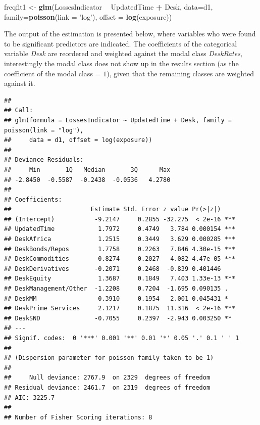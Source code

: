 \documentclass[]{DissertateUSU}
\newenvironment{Shaded}{\begin{snugshade}}{\end{snugshade}}
\newcommand{\KeywordTok}[1]{\textcolor[rgb]{0.13,0.29,0.53}{\textbf{#1}}}
\newcommand{\DataTypeTok}[1]{\textcolor[rgb]{0.13,0.29,0.53}{#1}}
\newcommand{\StringTok}[1]{\textcolor[rgb]{0.31,0.60,0.02}{#1}}
\newcommand{\OperatorTok}[1]{\textcolor[rgb]{0.81,0.36,0.00}{\textbf{#1}}}
\newcommand{\NormalTok}[1]{#1}
\begin{document}
\singlespacing

\begin{Shaded}
\begin{Highlighting}[]
\NormalTok{freqfit1 <-}\StringTok{ }\KeywordTok{glm}\NormalTok{(LossesIndicator }\OperatorTok{~}\StringTok{ }\NormalTok{UpdatedTime }\OperatorTok{+}\StringTok{ }\NormalTok{Desk, }\DataTypeTok{data=}\NormalTok{d1, }
               \DataTypeTok{family=}\KeywordTok{poisson}\NormalTok{(}\DataTypeTok{link =} \StringTok{'log'}\NormalTok{), }\DataTypeTok{offset =} \KeywordTok{log}\NormalTok{(exposure))}
\end{Highlighting}
\end{Shaded}

\doublespacing

The output of the estimation is presented below, where variables who
were found to be significant predictors are indicated. The coefficients
of the categorical variable \emph{Desk} are reordered and weighted
against the modal class \emph{DeskRates}, interestingly the modal class
does not show up in the results section (as the coefficient of the modal
class = \(1\)), given that the remaining classes are weighted against
it.

\singlespacing

\begin{verbatim}
## 
## Call:
## glm(formula = LossesIndicator ~ UpdatedTime + Desk, family = poisson(link = "log"), 
##     data = d1, offset = log(exposure))
## 
## Deviance Residuals: 
##     Min       1Q   Median       3Q      Max  
## -2.8450  -0.5587  -0.2438  -0.0536   4.2780  
## 
## Coefficients:
##                      Estimate Std. Error z value Pr(>|z|)    
## (Intercept)           -9.2147     0.2855 -32.275  < 2e-16 ***
## UpdatedTime            1.7972     0.4749   3.784 0.000154 ***
## DeskAfrica             1.2515     0.3449   3.629 0.000285 ***
## DeskBonds/Repos        1.7758     0.2263   7.846 4.30e-15 ***
## DeskCommodities        0.8274     0.2027   4.082 4.47e-05 ***
## DeskDerivatives       -0.2071     0.2468  -0.839 0.401446    
## DeskEquity             1.3687     0.1849   7.403 1.33e-13 ***
## DeskManagement/Other  -1.2208     0.7204  -1.695 0.090135 .  
## DeskMM                 0.3910     0.1954   2.001 0.045431 *  
## DeskPrime Services     2.1217     0.1875  11.316  < 2e-16 ***
## DeskSND               -0.7055     0.2397  -2.943 0.003250 ** 
## ---
## Signif. codes:  0 '***' 0.001 '**' 0.01 '*' 0.05 '.' 0.1 ' ' 1
## 
## (Dispersion parameter for poisson family taken to be 1)
## 
##     Null deviance: 2767.9  on 2329  degrees of freedom
## Residual deviance: 2461.7  on 2319  degrees of freedom
## AIC: 3225.7
## 
## Number of Fisher Scoring iterations: 8
\end{verbatim}
\end{document}
